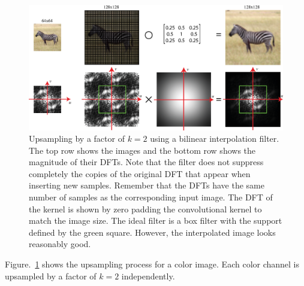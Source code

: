 \begin{figure}
\includegraphics[width=1\linewidth]{figures/upsamplig_downsampling/upsampling_bilinear.eps}
\caption{Upsampling by a factor of $k=2$ using a bilinear interpolation filter. The top row shows the images and the bottom row shows the magnitude of their DFTs. Note that the filter does not suppress completely the copies of the original DFT that appear when inserting new samples. Remember that the DFTs have the same number of samples as the corresponding input image. The DFT of the kernel is shown by zero padding the convolutional kernel to match the image size. The ideal filter is a box filter with the support defined by the green square.  However, the interpolated image looks reasonably good.
} 
\label{fig:upsamplingazebra}
\end{figure}

Figure.~\ref{fig:upsamplingazebra} shows the upsampling process for a color image. Each color channel is upsampled by a factor of $k=2$ independently. 

